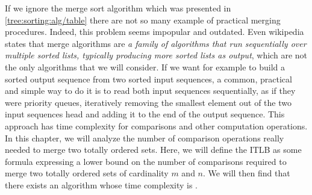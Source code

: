 \label{tree:merging:intro}

If we ignore the merge sort algorithm which was presented in
\ref{tree:sorting:alg/table} there are not so many example of practical merging
procedures. Indeed, this problem seems impopular and outdated. Even wikipedia
states that merge algorithms are \emph{a family of algorithms that run
sequentially over multiple sorted lists, typically producing more sorted lists
as output}, which are not the only algorithms that we will consider. If we want
for example to build a sorted output sequence from two sorted input sequences,
a common, practical and simple way to do it is to read both input sequences
sequentially, as if they were priority queues, iteratively removing the
smallest element out of the two input sequences head and adding it to the end
of the output sequence. This approach has  time complexity for
comparisons and other computation operations. In this chapter, we will analyze
the number of comparison operations really needed to merge two totally ordered
sets. Here, we will define the ITLB as some formula expressing a lower bound on
the number of comparisons required to merge two totally ordered sets of
cardinality $m$ and $n$. We will then find that there exists an algorithm whose
time complexity is .

